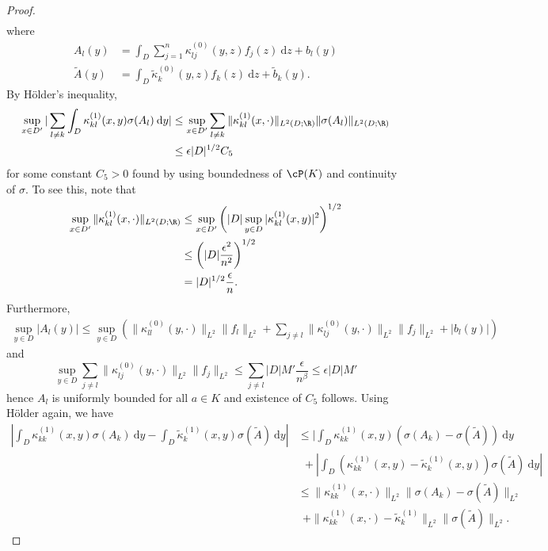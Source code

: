 {\begin{proof}
\begin{align*}
\end{align*}
where
\begin{align*}
    A_l(y) &= \int_D \sum_{j=1}^n \kappa^{(0)}_{lj} (y,z) f_j(z) \: \text{d}z + b_l(y) \\
    \tilde{A}(y) &= \int_D \tilde{\kappa}_k^{(0)}(y,z) f_k(z) \: \text{d}z + \tilde{b}_k(y).
\end{align*}
By H{\"o}lder's inequality,
\begin{align*}
    \sup_{x \in D'} |\sum_{l \neq k} \int_D \kappa^{(1)}_{kl}(x,y) \sigma(A_l) \: \text{d}y| &\leq \sup_{x \in D'} \sum_{l \neq k}  \|\kappa^{(1)}_{kl}(x,\cdot)\|_{L^2(D;\R)} \|\sigma(A_l)\|_{L^2(D;\R)} \\
    &\leq \epsilon |D|^{1/2} C_5
\end{align*}
for some constant \(C_5 > 0\) found by using boundedness of \(\cP(K)\) and continuity of \(\sigma\). To see this, note that
\begin{align*}
    \sup_{x \in D'} \|\kappa^{(1)}_{kl}(x,\cdot)\|_{L^2(D;\R)} &\leq \sup_{x \in D' } \left ( |D| \sup_{y \in D} |\kappa^{(1)}_{kl}(x,y)|^2 \right )^{1/2} \\
    &\leq \left( |D| \frac{\epsilon^2}{n^2} \right )^{1/2} \\
    &= |D|^{1/2} \frac{\epsilon}{n}.
\end{align*}
Furthermore, 
\begin{align*}
    \sup_{y \in D} |A_l(y)| \leq \sup_{y \in D} \left ( \|\kappa_{ll}^{(0)}(y,\cdot)\|_{L^2} \|f_l\|_{L^2} + \sum_{j \neq l} \|\kappa_{lj}^{(0)}(y,\cdot)\|_{L^2} \|f_j\|_{L^2} + |b_l(y)| \right )
\end{align*}
and 
\[\sup_{y \in D} \sum_{j \neq l} \|\kappa_{lj}^{(0)}(y,\cdot)\|_{L^2} \|f_j\|_{L^2} \leq \sum_{j \neq l} |D|M' \frac{\epsilon}{n^\beta} \leq \epsilon |D| M'\]
hence \(A_l\) is uniformly bounded for all \(a \in K\) and existence of \(C_5\) follows.
Using H{\"o}lder again, we have
\begin{align*}
    |\int_D \kappa^{(1)}_{kk}(x,y) \sigma(A_k) \: \text{d}y - \int_D \tilde{\kappa}^{(1)}_k(x,y) \sigma(\tilde{A}) \: \text{d}y| &\leq |\int_D \kappa_{kk}^{(1)}(x,y) (\sigma(A_k) - \sigma(\tilde{A})) \: \text{d}y \\
    &\:\:+ |\int_D (\kappa_{kk}^{(1)}(x,y) - \tilde{\kappa}^{(1)}_k(x,y)) \sigma(\tilde{A}) \: \text{d}y| \\
    &\leq \|\kappa_{kk}^{(1)}(x,\cdot)\|_{L^2} \|\sigma(A_k) - \sigma(\tilde{A})\|_{L^2} \\
    &\:\: + \|\kappa_{kk}^{(1)}(x,\cdot) - \tilde{\kappa}_k^{(1)} \|_{L^2} \|\sigma(\tilde{A})\|_{L^2}.

\end{align*}
\end{proof}}
